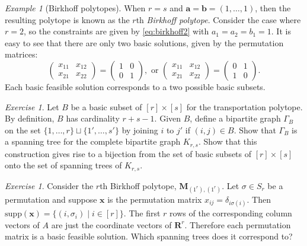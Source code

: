 \documentclass{amsbook}
\newcommand{\xx}{\mathbf x}
\newcommand{\bb}{\mathbf b}
\renewcommand{\aa}{\mathbf a}
\newcommand{\supp}{\mathrm{supp}}
\newcommand{\RR}{\mathbf R}
\newcommand{\MM}{\mathbf M}
\theoremstyle{definition}
\theoremstyle{remark}
\newtheorem{example}[theorem]{Example}
\newtheorem{exercise}[theorem]{Exercise}
\begin{document}
\begin{example}[Birkhoff polytopes]
  \label{example:birkhoff}
  When $r=s$ and $\aa=\bb=(1,\dotsc,1)$, then the resulting polytope is known as the $r$th \emph{Birkhoff polytope}.
  Consider the case where $r=2$, so the constraints are given by \eqref{eq:birkhoff2} with $a_1=a_2=b_1=1$.
  It is easy to see that there are only two basic solutions, given by the permutation matrices:
  \begin{displaymath}
    \begin{pmatrix}
      x_{11} & x_{12}\\
      x_{21} & x_{22}
    \end{pmatrix}
    =
    \begin{pmatrix}
      1 & 0\\
      0 & 1
    \end{pmatrix}, \text{ or }
    \begin{pmatrix}
      x_{11} & x_{12}\\
      x_{21} & x_{22}
    \end{pmatrix}
    =
    \begin{pmatrix}
      0 & 1\\
      1 & 0
    \end{pmatrix}.
  \end{displaymath}
  Each basic feasible solution corresponds to a two possible basic subsets.
\end{example}
\begin{exercise}
  Let $B$ be a basic subset of $[r]\times [s]$ for the transportation polytope.
  By definition, $B$ has cardinality $r+s-1$.
  Given $B$, define a bipartite graph $\Gamma_B$ on the set $\{1,\dotsc,r\}\sqcup \{1',\dotsc,s'\}$ by joining $i$ to $j'$ if $(i,j)\in B$.
  Show that $\Gamma_B$ is a spanning tree for the complete bipartite graph $K_{r,s}$.
  Show that this construction gives rise to a bijection from the set of basic subsets of $[r]\times[s]$ onto the set of spanning trees of $K_{r,s}$.
\end{exercise}
\begin{exercise}
  Consider the $r$th Birkhoff polytope, $\MM_{(1^r),(1^r)}$.
  Let $\sigma\in S_r$ be a permutation and suppose $\xx$ is the permutation matrix $x_{ij}=\delta_{i\sigma(i)}$.
  Then $\supp(\xx)=\{(i,\sigma_i)\mid i\in [r]\}$.
  The first $r$ rows of the corresponding column vectors of $A$ are just the coordinate vectors of $\RR^r$.
  Therefore each permutation matrix is a basic feasible solution.
  Which spanning trees does it correspond to?
\end{exercise}
\end{document}
